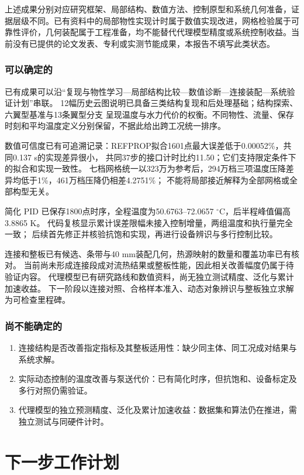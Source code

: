\documentclass[UTF8]{midterm}
\begin{document}
上述成果分别对应研究框架、局部结构、数值方法、控制原型和系统几何准备，证据层级不同。已有资料中的局部物性实现计时属于数值实现改进，网格检验属于可靠性评价，几何装配属于工程准备，均不能替代代理模型精度或系统控制收益。当前没有已提供的论文发表、专利或实测节能成果，本报告不填写此类状态。
\subsubsection{可以确定的}
已有成果可以沿“复现与物性学习—局部结构比较—数值诊断—连接装配—系统验证计划”串联。
12幅历史云图说明已具备三类结构复现和后处理基础；结构探索、六翼型基准与13条翼型分支
呈现温度与水力代价的权衡。不同物性、流量、保存时刻和平均温度定义分别保留，不据此给出跨工况统一排序。

数值可信度已有可追溯记录：REFPROP拟合1601点最大误差低于0.00052\%，共同0.137 s的实现差异很小，
共同37步的接口计时比约11.50；它们支持限定条件下的拟合和实现一致性。
七档网格统一以323万为参考后，294万档三项温度压降差异均低于1\%，461万档压降仍相差4.2751\%；
不能将局部接近解释为全部网格或全部构型无关。

简化 PID 已保存1800点时序，全程温度为50.6763--72.0657 $^\circ$C，后半程峰值偏高3.8865 K。
代码复核显示累计误差限幅未接入控制增量，两组温度和执行量完全一致；
后续首先修正并核验抗饱和实现，再进行设备辨识与多行控制比较。

连接和整板已有候选、条带与40 mm装配几何，热源映射的数量和覆盖功率已有核对。
当前尚未形成连接段成对流热结果或整板性能，因此相关改善幅度仍属于待验证内容。
代理模型已有研究路线和数值资料，尚无独立测试精度、泛化与累计加速收益。
下一阶段以连接对照、合格样本准入、动态对象辨识与整板独立求解为可检查里程碑。
\subsubsection{尚不能确定的}
\begin{enumerate}
\item 连接结构是否改善指定指标及其整板适用性：缺少同主体、同工况成对结果与系统求解。
\item 实际动态控制的温度改善与泵送代价：已有简化时序，但抗饱和、设备标定及多行对照仍需验证。
\item 代理模型的独立预测精度、泛化及累计加速收益：数据集和算法仍在推进，需独立测试与同硬件计时。
\end{enumerate}


\section{下一步工作计划}
\end{document}
